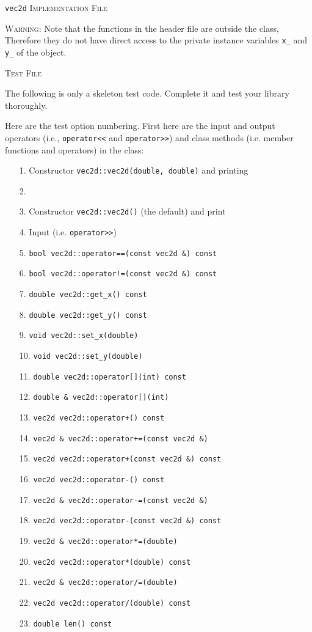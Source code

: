 {\small
{}
}

\newpage
\texttt{vec2d} \textsc{Implementation File}


\textsc{Warning:}
Note that the functions in the header file are outside the class,
Therefore
they do not have direct access to the private instance variables
\verb!x_! and \verb!y_! of the
object.

{\small
{}
}

\newpage
\textsc{Test File}

The following is only a skeleton test code.
Complete it and test your library thoroughly.

{\small
{}
}

Here are the test option numbering. First here are the input and output
operators
(i.e., \verb!operator<<! and
\verb!operator>>!) and class methods (i.e. member functions and
operators) in the class:
\begin{itemize}
  \item[ 1.] Constructor \verb!vec2d::vec2d(double, double)! and printing
  \item[ 2.] 
  \item[ 3.] Constructor \verb!vec2d::vec2d()! (the default) and print
  \item[ 4.] Input (i.e. \verb!operator>>!)
  \item[ 5.] \verb!bool vec2d::operator==(const vec2d &) const!
  \item[ 6.] \texttt{bool vec2d::operator!=(const vec2d \&) const}
  \item[ 7.] \verb!double vec2d::get_x() const!
  \item[ 8.] \verb!double vec2d::get_y() const!
  \item[ 9.] \verb!void vec2d::set_x(double)!
  \item[10.] \verb!void vec2d::set_y(double)!
  \item[11.] \verb!double vec2d::operator[](int) const!
  \item[12.] \verb!double & vec2d::operator[](int)!
  \item[13.] \verb!vec2d vec2d::operator+() const!
  \item[14.] \verb!vec2d & vec2d::operator+=(const vec2d &)!
  \item[15.] \verb!vec2d vec2d::operator+(const vec2d &) const!
  \item[16.] \verb!vec2d vec2d::operator-() const!
  \item[17.] \verb!vec2d & vec2d::operator-=(const vec2d &)!
  \item[18.] \verb!vec2d vec2d::operator-(const vec2d &) const!
  \item[19.] \verb!vec2d & vec2d::operator*=(double)!
  \item[20.] \verb!vec2d vec2d::operator*(double) const!
  \item[21.] \verb!vec2d & vec2d::operator/=(double)!
  \item[22.] \verb!vec2d vec2d::operator/(double) const!
  \item[23.] \verb!double len() const!
\end{itemize}
